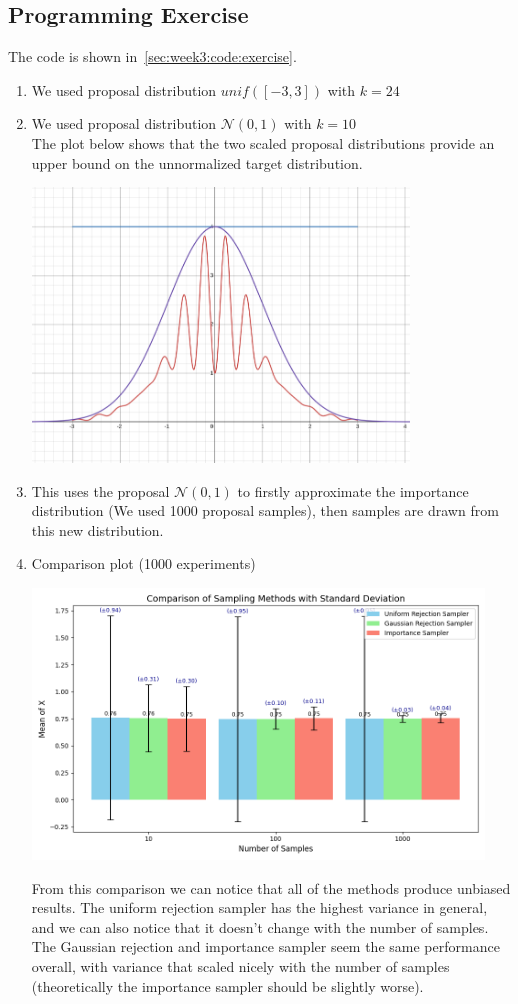 \subsection{Programming Exercise}
The code is shown in~\cref{sec:week3:code:exercise}.
\begin{enumerate}
  \item We used proposal distribution $unif([-3,3])$ with $k=24$
  \item We used proposal distribution $\mathcal{N}(0,1) $ with $k=10$ \\
   The plot below shows that the two scaled proposal distributions provide an upper bound on the unnormalized target distribution.
  \begin{center}
      \includegraphics[width=10cm]{./figures/proposals.png}
  \end{center}
  \item This uses the proposal $\mathcal{N}(0,1)$ to firstly approximate the importance distribution (We used 1000 proposal samples), then samples are drawn from this new distribution.
  \item Comparison plot (1000 experiments)
  \begin{center}
      \includegraphics[width=12cm]{./figures/comparison1.png}
  \end{center}
  From this comparison we can notice that all of the methods produce unbiased results.
  The uniform rejection sampler has the highest variance in general, 
  and we can also notice that it doesn't change with the number of samples.
  The Gaussian rejection and importance sampler seem the same performance overall,
  with variance that scaled nicely with the number of samples
  (theoretically the importance sampler should be slightly worse).
\end{enumerate}


